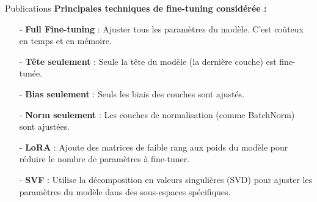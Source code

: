 \begin{subsectionframemod}{Publications}
    \textbf{Principales techniques de fine-tuning considérée :}
    \begin{itemize}
        \item[-] \textbf{Full Fine-tuning} : Ajuster tous les paramètres du modèle. C'est coûteux en temps et en mémoire.
        \item[-] \textbf{Tête seulement} : Seule la tête du modèle (la dernière couche) est fine-tunée.
        \item[-] \textbf{Bias seulement} : Seuls les biais des couches sont ajustés.
        \item[-] \textbf{Norm seulement} : Les couches de normalisation (comme BatchNorm) sont ajustées.
        \item[-] \textbf{LoRA} : Ajoute des matrices de faible rang aux poids du modèle pour réduire le nombre de paramètres à fine-tuner.
        \item[-] \textbf{SVF} : Utilise la décomposition en valeurs singulières (SVD) pour ajuster les paramètres du modèle dans des sous-espaces spécifiques.
    \end{itemize}

\end{subsectionframemod}


